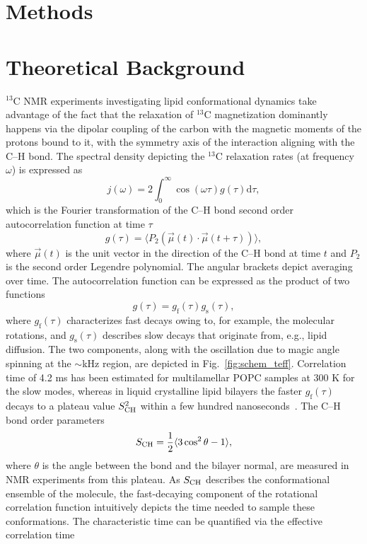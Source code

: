 \documentclass[journal=jpcbfk,manuscript=article,layout=twocolumn]{achemso}
\begin{document}
\section{Methods}
\section{Theoretical Background}\label{sec:theory}
$^{13}$C NMR experiments investigating lipid conformational dynamics take advantage of the fact that the relaxation of $^{13}$C magnetization dominantly happens via the dipolar coupling of the carbon with the magnetic moments of the protons bound to it, with the symmetry axis of the interaction aligning with the C--H bond. The spectral density depicting the $^{13}$C relaxation rates (at frequency $\omega$) is expressed as
\begin{equation}
j{(\omega)}=2\int_{0}^{\infty}\cos(\omega\tau)g(\tau)\mathrm d\tau ,
\end{equation}
which is the Fourier transformation of the C--H bond second order autocorrelation function at time $\tau$
\begin{equation}
\label{eq:BCF}
g(\tau)=\langle P_{2}\left(\vec{\mu}(t)\cdot \vec{\mu}(t+\tau)\right)\rangle ,
\end{equation}
where $\vec{\mu}(t)$ is the unit vector in the direction of the C--H bond at time $t$ and $P_{2}$ is the second order Legendre polynomial. The angular brackets depict averaging over time. The autocorrelation function can be expressed as the product of two functions
\begin{equation}
g(\tau)=g_{\mathrm{f}}(\tau)g_{\mathrm{s}}(\tau) ,
\end{equation} 
where $g_{\mathrm{f}}(\tau)$ characterizes fast decays owing to, for example, the molecular  rotations, and $g_{\mathrm{s}}(\tau)$ describes slow decays that originate from, e.g., lipid diffusion. The two components, along with the oscillation due to magic angle spinning at the $\sim$kHz region, are depicted in Fig.~\ref{fig:schem_teff}. Correlation time of 4.2 ms has been estimated for multilamellar POPC samples at 300 K for the slow modes, whereas  in liquid crystalline lipid bilayers the faster $g_{\mathrm{f}}(\tau)$ decays to a plateau value $S^{2}_{\rm{CH}}$ within a few hundred nanoseconds~\cite{ferreira15}. The C--H bond order parameters
\begin{equation}
\label{eq:OP}
S_{\rm{CH}}=\frac{1}{2}\langle 3\cos^{2}\theta-1\rangle ,
\end{equation}
where $\theta$ is the angle between the bond and the bilayer normal, are measured in NMR experiments from this plateau. As $S_{\rm{CH}}$ describes the conformational ensemble of the molecule, the fast-decaying component of the rotational correlation function intuitively depicts the time needed to sample these conformations. The characteristic time can be quantified via the effective correlation time
\end{document}
